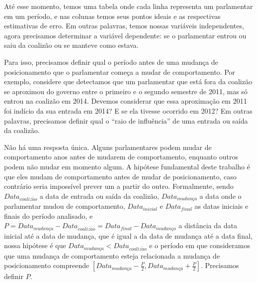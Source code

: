 \documentclass[a4paper,titlepage]{ppgi}\usepackage[]{graphicx}\usepackage[]{color}
\begin{document}
Até esse momento, temos uma tabela onde cada linha representa um parlamentar em
um período, e nas colunas temos seus pontos ideais e as respectivas estimativas
de erro. Em outras palavras, temos nossas variáveis independentes, agora
precisamos determinar a variável dependente: se o parlamentar entrou ou saiu da
coalizão ou se manteve como estava.

Para isso, precisamos definir qual o período antes de uma mudança de
posicionamento que o parlamentar começa a mudar de comportamento. Por exemplo,
considere que detectamos que um parlamentar que está fora da coalizão se
aproximou do governo entre o primeiro e o segundo semestre de 2011, mas só
entrou na coalizão em 2014. Devemos considerar que essa aproximação em 2011 foi
indício da sua entrada em 2014? E se ela tivesse ocorrido em 2012?  Em outras
palavras, precisamos definir qual o ``raio de influência'' de uma entrada ou
saída da coalizão.

Não há uma resposta única. Alguns parlamentares podem mudar de comportamento
anos antes de mudarem de comportamento, enquanto outros podem não mudar em
momento algum. A hipótese fundamental deste trabalho é que eles mudam de
comportamento antes de mudar de posicionamento, caso contrário seria impossível
prever um a partir do outro. Formalmente, sendo $Data_{coaliz\tilde{a}o}$ a
data de entrada ou saída da coalizão, $Data_{mudan\textit{\c{c}}a}$ a data onde
o parlamentar mudou de comportamento, $Data_{inicial}$ e $Data_{final}$ as
datas iniciais e finais do período analisado, e $P =
Data_{mudan\textit{\c{c}}a} - Data_{coaliz\tilde{a}o} = Data_{final} -
Data_{mudan\textit{\c{c}}a}$ a distância da data inicial até a data de mudança,
que é igual a da data de mudança até a data final, nossa hipótese é que
$Data_{mudan\textit{\c{c}}a} < Data_{coaliz\tilde{a}o}$ e o período em que
consideramos que uma mudança de comportamento esteja relacionada a mudança de
posicionamento compreende $\left[Data_{mudan\textit{\c{c}}a} - \frac{P}{2},
Data_{mudan\textit{\c{c}}a} + \frac{P}{2}\right]$. Precisamos definir $P$.
\end{document}
